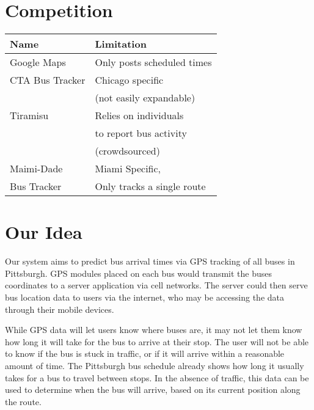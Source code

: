 \documentclass[pageno]{jpaper}
\begin{document}
\section{Competition}

\begin{table}[h!]
  \centering
  \begin{tabular}{|l|l|}
    \hline
    \textbf{Name} & \textbf{Limitation}\\
    \hline
    \hline
    Google Maps & Only posts scheduled times \\
    \hline
    CTA Bus Tracker & Chicago specific \\
        &(not easily expandable)\cite{CTA} \\
    \hline
    Tiramisu & Relies on individuals \\
                    &to report bus activity\\
                    &(crowdsourced) \cite{Tiramisu}\\
    \hline
    Maimi-Dade  & Miami Specific,\\
    Bus Tracker & Only tracks a single route \\
    \hline
  \end{tabular}
  \label{table:formatting}
\end{table}

\section{Our Idea}

Our system aims to predict bus arrival times via GPS tracking of all buses in Pittsburgh.
GPS modules placed on each bus would transmit the buses coordinates to a server
application via cell networks. The server could then serve bus location data
to users via the internet, who may be accessing the data through their mobile
devices.

While GPS data will let users know where buses are, it may not let them
know how long it will take for the bus to arrive at their stop. The user will
not be able to know if the bus is stuck in traffic, or if it will arrive within
a reasonable amount of time. The Pittsburgh bus schedule already shows how long
it usually takes for a bus to travel between stops. In the absence of traffic,
this data can be used to determine when the bus will arrive, based on its current
position along the route.
\end{document}
